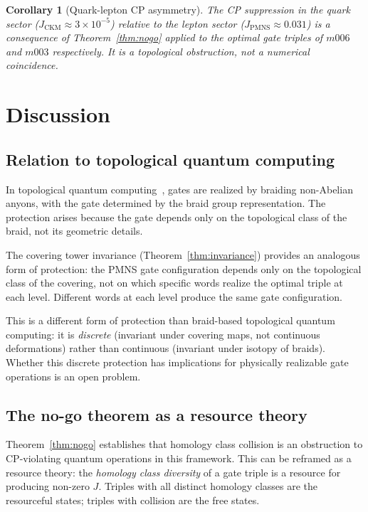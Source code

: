 \documentclass[12pt]{article}
\newtheorem{corollary}[theorem]{Corollary}
\theoremstyle{definition}
\begin{document}
\begin{corollary}[Quark-lepton CP asymmetry]
\label{cor:asymmetry}
The CP suppression in the quark sector ($J_\mathrm{CKM} \approx
3\times 10^{-5}$) relative to the lepton sector ($J_\mathrm{PMNS}
\approx 0.031$) is a consequence of Theorem~\ref{thm:nogo}
applied to the optimal gate triples of $m006$ and $m003$
respectively. It is a topological obstruction, not a numerical
coincidence.
\end{corollary}

\section{Discussion}
\label{sec:discussion}

\subsection{Relation to topological quantum computing}

In topological quantum computing~\cite{Kitaev2003,Nayak2008},
gates are realized by braiding non-Abelian anyons, with the gate
determined by the braid group representation. The protection
arises because the gate depends only on the topological class of
the braid, not its geometric details.

The covering tower invariance (Theorem~\ref{thm:invariance})
provides an analogous form of protection: the PMNS gate
configuration depends only on the topological class of the
covering, not on which specific words realize the optimal triple
at each level. Different words at each level produce the same
gate configuration.

This is a different form of protection than braid-based
topological quantum computing: it is \emph{discrete} (invariant
under covering maps, not continuous deformations) rather than
continuous (invariant under isotopy of braids). Whether this
discrete protection has implications for physically realizable
gate operations is an open problem.

\subsection{The no-go theorem as a resource theory}

Theorem~\ref{thm:nogo} establishes that homology class collision
is an obstruction to CP-violating quantum operations in this
framework. This can be reframed as a resource theory: the
\emph{homology class diversity} of a gate triple is a resource
for producing non-zero $J$. Triples with all distinct homology
classes are the resourceful states; triples with collision are
the free states.
\end{document}
